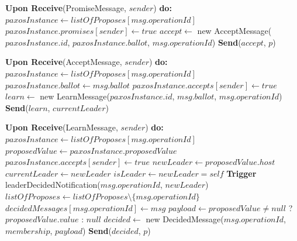\documentclass[10pt,a4paper,twocolumn]{article}
\begin{document}
\begin{algorithm}
\begin{algorithmic}
\State \textbf{Upon Receive}(PromiseMessage, $sender$) \textbf{do:}
\State \Return
\EndIf
\State $paxosInstance \leftarrow listOfProposes[msg.operationId]$
\State $paxosInstance.promises[sender] \leftarrow true$
\State $accept \leftarrow$ new AcceptMessage($paxosInstance.id$, $paxosInstance.ballot$, $msg.operationId$)
\State \textbf{Send}($accept$, $p$)
\EndFor
\EndIf
\State

\State \textbf{Upon Receive}(AcceptMessage, $sender$) \textbf{do:}
\State $paxosInstance \leftarrow listOfProposes[msg.operationId]$
\State $paxosInstance.ballot \leftarrow msg.ballot$
\State $paxosInstance.accepts[sender] \leftarrow true$
\State $learn \leftarrow$ new LearnMessage($paxosInstance.id$, $msg.ballot$, $msg.operationId$)
\State \textbf{Send}($learn$, $currentLeader$)
\EndIf
\State

\State \textbf{Upon Receive}(LearnMessage, $sender$) \textbf{do:}
\State $paxosInstance \leftarrow listOfProposes[msg.operationId]$
\State \Return
\EndIf
\State $proposedValue \leftarrow paxosInstance.proposedValue$
\State $paxosInstance.accepts[sender] \leftarrow true$
\State $newLeader \leftarrow proposedValue.host$
\State $currentLeader \leftarrow newLeader$
\State $isLeader \leftarrow newLeader = self$
\State \textbf{Trigger} leaderDecidedNotification($msg.operationId$, $newLeader$)
\EndIf
\State $listOfProposes \leftarrow listOfProposes \setminus \{msg.operationId\}$
\State $decidedMessages[msg.operationId] \leftarrow msg$
\State $payload \leftarrow proposedValue \neq null$ ? $proposedValue.value$ : $null$
\State $decided \leftarrow$ new DecidedMessage($msg.operationId$, $membership$, $payload$)
\State \textbf{Send}($decided$, $p$)
\EndFor
\EndIf
\EndIf
\end{algorithmic}
\end{algorithm}
\end{document}
